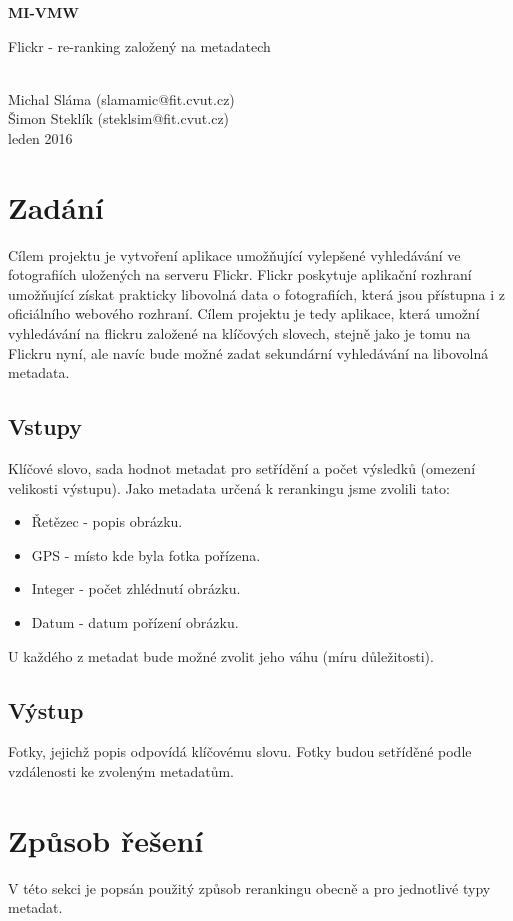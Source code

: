 \documentclass[12pt,oneside,a4paper]{article}
\begin{document}
\begin{center}
\bf MI-VMW\\[2mm]
    \begin{Large}Flickr - re-ranking založený na metadatech\end{Large}\\[3mm]
       Michal Sláma (slamamic@fit.cvut.cz)\\
       Šimon Steklík (steklsim@fit.cvut.cz)\\
leden 2016
\end{center}

\section{Zadání}
Cílem projektu je vytvoření aplikace umožňující vylepšené vyhledávání ve fotografiích uložených na serveru
Flickr. Flickr poskytuje aplikační rozhraní umožňující získat prakticky libovolná data o fotografiích, která jsou
přístupna i z oficiálního webového rozhraní. Cílem projektu je tedy aplikace, která umožní vyhledávání na
flickru založené na klíčových slovech, stejně jako je tomu na Flickru nyní, ale navíc bude možné zadat
sekundární vyhledávání na libovolná metadata.

\subsection{Vstupy}
Klíčové slovo, sada hodnot metadat pro setřídění a počet výsledků (omezení velikosti výstupu).
Jako metadata určená k rerankingu jsme zvolili tato:
\begin{itemize}
	\item Řetězec - popis obrázku.
	\item GPS - místo kde byla fotka pořízena.
	\item Integer - počet zhlédnutí obrázku.
	\item Datum - datum pořízení obrázku.
\end{itemize}
U každého z metadat bude možné zvolit jeho váhu (míru důležitosti).

\subsection{Výstup}
Fotky, jejichž popis odpovídá klíčovému slovu. Fotky budou setříděné podle vzdálenosti ke zvoleným
metadatům.

\section{Způsob řešení}
V této sekci je popsán použitý způsob rerankingu obecně a pro jednotlivé typy metadat.
\end{document}
